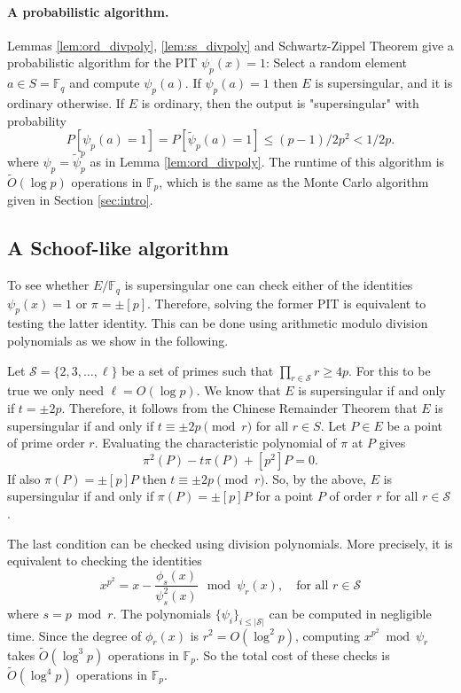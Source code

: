 \documentclass[12pt]{article}
\theoremstyle{plain}
\theoremstyle{definition}
\newcommand{\abs}[1]{\left\vert#1\right\vert}
\newcommand{\tildO}{\tilde{O}}
\def\F{\ensuremath{\mathbb{F}}}
\begin{document}
\paragraph{A probabilistic algorithm.}
Lemmas \ref{lem:ord_divpoly}, \ref{lem:ss_divpoly} and Schwartz-Zippel Theorem give a probabilistic 
algorithm for the PIT $\psi_p(x) = 1$: Select a random element $a \in S = \F_q$ and compute 
$\psi_p(a)$. If $\psi_p(a) = 1$ then $E$ is supersingular, and it is ordinary otherwise. If $E$ is 
ordinary, then the output is "supersingular" with probability 
\[ P[\psi_p(a) = 1] = P[\tilde{\psi}_p(a) = 1] \le (p - 1) / 2p^2 < 1 / 2p. \] 
where $\psi_p = \tilde{\psi}_p^p$ as in Lemma \ref{lem:ord_divpoly}. The runtime of this algorithm 
is $\tildO(\log p)$ operations in $\F_p$, which is the same as the Monte Carlo algorithm given in 
Section \ref{sec:intro}.



\subsection{A Schoof-like algorithm}

To see whether $E/\F_q$ is supersingular one can check either of the identities $\psi_p(x) = 1$ or 
$\pi = \pm [p]$. Therefore, solving the former PIT is equivalent to testing the latter identity. 
This can be done using arithmetic modulo division polynomials as we show in the following. 

Let $\mathcal{S} = \{2, 3, \dots, \ell\}$ be a set of primes such that $\prod_{r \in \mathcal{S}} r 
\ge 4p$. For this to be true we only need $\ell = O(\log p)$. We know that $E$ is supersingular if 
and only if $t = \pm 2p$. Therefore, it follows from the Chinese Remainder Theorem that $E$ is 
supersingular if and only if $t \equiv \pm 2p \pmod{r}$ for all $r \in S$. Let $P \in E$ be a point 
of prime order $r$. Evaluating the characteristic polynomial of $\pi$ at $P$ gives
\[ \pi^2(P) - t\pi(P) + [p^2]P = 0. \]
If also $\pi(P) = \pm [p]P$ then $t \equiv \pm 2p \pmod{r}$. So, by the above, $E$ is supersingular 
if and only if $\pi(P) = \pm [p]P$ for a point $P$ of order $r$ for all $r \in \mathcal{S}$.

The last condition can be checked using division polynomials. More precisely, it is equivalent to 
checking the identities
\begin{equation}
\label{equ:schoof}
	x^{p^2} = x - \frac{\phi_s(x)}{\psi_s^2(x)} ~ \bmod \psi_r(x), \quad \text{for all } r \in 
	\mathcal{S}
\end{equation}
where $s = p \bmod r$. The polynomials $\{ \psi_i \}_{i \le \abs{\mathcal{S}}}$ can be computed in 
negligible 
time. Since the degree of $\phi_r(x)$ is $r^2 = O(\log^2 p)$, computing $x^{p^2} \bmod \psi_r$ 
takes $\tildO(\log^3 p)$ operations in $\F_p$. So the total cost of these checks is $\tildO(\log^4 
p)$ operations in $\F_p$.
\end{document}

